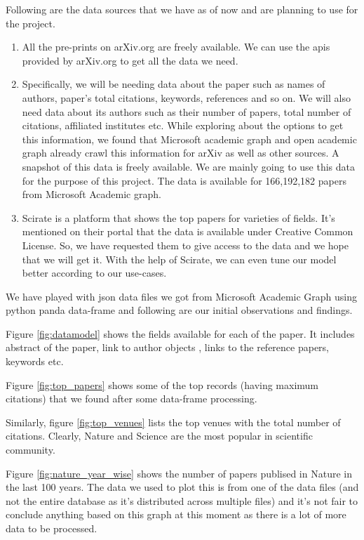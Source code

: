 \documentclass[a4paper, 11pt]{article}
\begin{document}
Following are the data sources that we have as of now and are planning to use for the project. 
\begin{enumerate}
\item All the pre-prints on arXiv.org are freely available. We can use the apis provided by arXiv.org to get all the data we need.  
\item Specifically, we will be needing data about the paper such as names of authors, paper's total citations, keywords, references and so on. We will also need data about its authors such as their number of papers, total number of citations, affiliated institutes etc. While exploring about the options to get this information, we found that Microsoft academic graph and open academic graph \cite{data} already crawl this information for arXiv as well as other sources. A snapshot of this data is freely available. We are mainly going to use this data for the purpose of this project.  The data is available for 166,192,182 papers from Microsoft Academic graph.
\item Scirate \cite{scirate} is a platform that shows the top papers for varieties of fields. It's mentioned on their portal that the data is available under Creative Common License. So, we have requested them to give access to the data and we hope that we will get it. With the help of Scirate, we can even tune our model better according to our use-cases.
\end{enumerate}

We have played with json data files we got from Microsoft Academic Graph using python panda data-frame and following are our initial observations and findings.

Figure \ref{fig:datamodel} shows the fields available for each of the paper. It includes abstract of the paper, link to author objects , links to the reference papers, keywords etc. 

Figure \ref{fig:top_papers} shows some of the top records (having maximum citations) that we found after some data-frame processing.

Similarly, figure \ref{fig:top_venues} lists the top venues with the total number of citations. Clearly, Nature and Science are the most popular in scientific community. 

Figure \ref{fig:nature_year_wise} shows the number of papers publised in Nature in the last 100 years. The data we used to plot this is from one of the data files (and not the entire database as it's distributed across multiple files) and it's not fair to conclude anything based on this graph at this moment as there is a lot of more data to be processed.
\end{document}
